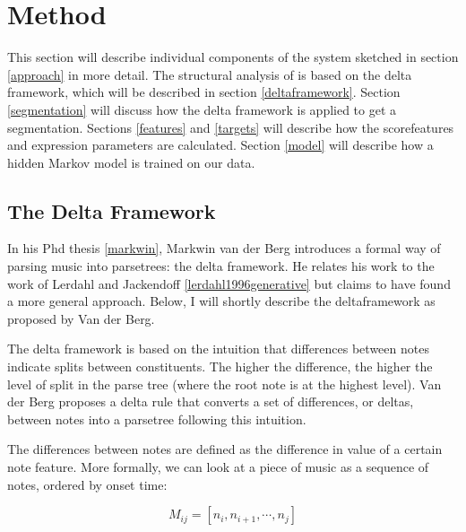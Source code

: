 \documentclass[a4paper,10pt]{article}
\begin{document}

\section{Method}

This section will describe individual components of the system sketched in section \ref{approach} in more detail. The structural analysis of is based on the delta framework, which will be described in section \ref{deltaframework}.  Section \ref{segmentation} will discuss how the delta framework is applied to get a segmentation. Sections \ref{features} and \ref{targets} will describe how the scorefeatures and expression parameters are calculated. Section \ref{model} will describe how a hidden Markov model is trained on our data.

\subsection{The Delta Framework}

In his Phd thesis \ref{markwin}, Markwin van der Berg introduces a formal way of parsing music into parsetrees: the delta framework. He relates his work to the work of Lerdahl and Jackendoff \ref{lerdahl1996generative} but claims to have found a more general approach. Below, I will shortly describe the deltaframework as proposed by Van der Berg.

The delta framework is based on the intuition that differences between notes indicate splits between constituents. The higher the difference, the higher the level of split in the parse tree (where the root note is at the highest level). Van der Berg proposes a delta rule that converts a set of differences, or deltas, between notes into a parsetree following this intuition. 

The differences between notes are defined as the difference in value of a certain note feature. More formally, we can look at a piece of music as a sequence of notes, ordered by onset time:

\[M_{ij} = [n_i, n_{i+1}, \cdots, n_j]\]
\end{document}
